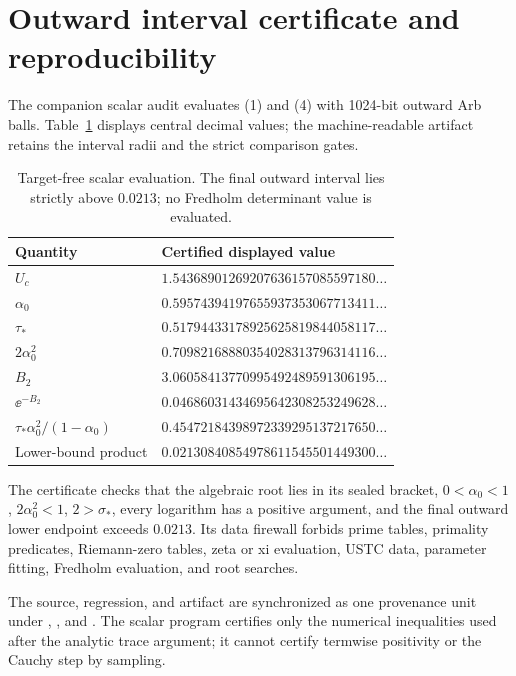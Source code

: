 \section{Outward interval certificate and reproducibility}

The companion scalar audit evaluates (1) and (4) with 1024-bit outward Arb
balls.  Table~\ref{tab:lower-constants} displays central decimal values; the
machine-readable artifact retains the interval radii and the strict
comparison gates.

\begin{table}[h]
\centering
\small
\begin{tabular}{@{}ll@{}}
\toprule
Quantity & Certified displayed value \\
\midrule
\(U_c\) & \(1.54368901269207636157085597180\ldots\) \\
\(\alpha_0\) & \(0.59574394197655937353067713411\ldots\) \\
\(\tau_*\) & \(0.51794433178925625819844058117\ldots\) \\
\(2\alpha_0^2\) & \(0.70982168880354028313796314116\ldots\) \\
\(B_2\) & \(3.06058413770995492489591306195\ldots\) \\
\(\ee^{-B_2}\) & \(0.04686031434695642308253249628\ldots\) \\
\(\tau_*\alpha_0^2/(1-\alpha_0)\)
 & \(0.45472184398972339295137217650\ldots\) \\
Lower-bound product & \(0.02130840854978611545501449300\ldots\) \\
\bottomrule
\end{tabular}
\caption{Target-free scalar evaluation.  The final outward interval lies
strictly above \(0.0213\); no Fredholm determinant value is evaluated.}
\label{tab:lower-constants}
\end{table}

The certificate checks that the algebraic root lies in its sealed bracket,
\(0<\alpha_0<1\), \(2\alpha_0^2<1\), \(2>\sigma_*\), every logarithm has a
positive argument, and the final outward lower endpoint exceeds \(0.0213\).
Its data firewall forbids prime tables, primality predicates, Riemann-zero
tables, zeta or xi evaluation, USTC data, parameter fitting, Fredholm
evaluation, and root searches.

The source, regression, and artifact are synchronized as one provenance unit
under , , and
.  The scalar
program certifies only the numerical inequalities used after the analytic
trace argument; it cannot certify termwise positivity or the Cauchy step by
sampling.

